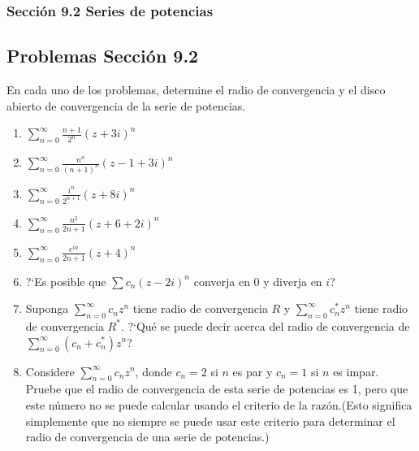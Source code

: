\documentclass[12pt,letterpaper]{article}
\begin{document}
	\subsubsection* {Secci\'on 9.2 Series de potencias}
	\subsection* {Problemas Secci\'on 9.2}
\justify
En cada uno de los problemas, determine el radio de convergencia y el disco abierto de convergencia de la serie de potencias.
\begin{enumerate}
\item $\sum\limits_{n=0}^\infty\frac{n+1}{2^n}(z+3i)^n$
\item $\sum\limits_{n=0}^\infty\frac{n^n}{(n+1)^n}(z-1+3i)^n$
\item $\sum\limits_{n=0}^\infty\frac{i^n}{2^{n+1}}(z+8i)^n$
\item $\sum\limits_{n=0}^\infty\frac{n^2}{2n+1}(z+6+2i)^n$
\item $\sum\limits_{n=0}^\infty\frac{e^{in}}{2n+1}(z+4)^n$
\item ?`Es posible que $\sum c_{n}(z-2i)^n$ converja en 0 y diverja en $i$?
\item Suponga $\sum\limits_{n=0}^\infty c_{n}z^n$ tiene radio de convergencia $R$ y $\sum\limits_{n=0}^\infty c_{n}^*z^n$ tiene radio de convergencia $R^*$. ?`Qu\'e se puede decir acerca del radio de convergencia de $\sum\limits_{n=0}^\infty(c_{n}+c_{n}^*)z^n$?
\item Considere $\sum\limits_{n=0}^\infty c_{n}z^n$, donde $c_{n}=2$  si $n$ es par y $c_{n}=1$ si $n$ es impar. Pruebe que el radio de convergencia de esta serie de potencias es 1, pero que este n\'umero no se puede calcular usando el criterio de la raz\'on.(Esto significa simplemente que no siempre se puede usar este criterio para determinar el radio de convergencia de una serie de potencias.)
\end{enumerate}
\end{document}
